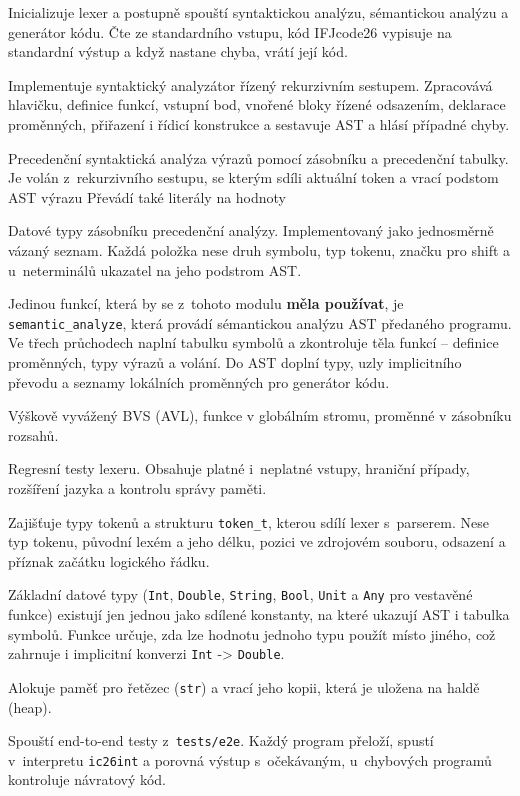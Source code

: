 \begin{description}[style=nextline]
  \item[\texttt{main.c}]
    Inicializuje lexer a postupně spouští syntaktickou analýzu, sémantickou
    analýzu a generátor kódu. Čte ze standardního vstupu, kód IFJcode26
    vypisuje na standardní výstup a když nastane chyba, vrátí její kód.
  \item[\texttt{parser.c/.h}]               Implementuje syntaktický analyzátor řízený rekurzivním sestupem. Zpracovává hlavičku, definice funkcí, vstupní bod, vnořené bloky řízené odsazením, deklarace proměnných, přiřazení i řídicí konstrukce a sestavuje AST a hlásí případné chyby.
  \item[\texttt{parser\_expression.c/.h}]
    Precedenční syntaktická analýza výrazů pomocí zásobníku a precedenční tabulky. Je volán z~rekurzivního
    sestupu, se kterým sdíli aktuální token a vrací podstom AST výrazu Převádí také literály na hodnoty
  \item[\texttt{parser\_stack.h}]
    Datové typy zásobníku precedenční analýzy. Implementovaný jako jednosměrně vázaný seznam.
    Každá položka nese druh symbolu, typ tokenu, značku pro shift a u~neterminálů ukazatel na jeho podstrom AST.
  \item[\texttt{semantic.c/.h}]
    Jedinou funkcí, která by se z~tohoto modulu \textbf{měla používat},
    je \texttt{semantic\_analyze}, která provádí sémantickou analýzu AST
    předaného programu. Ve třech průchodech naplní tabulku symbolů a zkontroluje
    těla funkcí -- definice proměnných, typy výrazů a volání. Do AST doplní typy, uzly implicitního převodu
    a seznamy lokálních proměnných pro generátor kódu.
  \item[\texttt{symtable.c/.h}]
    Výškově vyvážený BVS (AVL), funkce v globálním stromu, proměnné v zásobníku rozsahů.
  \item[\texttt{test\_lexer.c}]
    Regresní testy lexeru. Obsahuje platné i~neplatné vstupy, hraniční
    případy, rozšíření jazyka a kontrolu správy paměti.
  \item[\texttt{token.h}]
    Zajišťuje typy tokenů a strukturu \texttt{token\_t}, kterou sdílí lexer
    s~parserem. Nese typ tokenu, původní lexém a jeho délku, pozici ve
    zdrojovém souboru, odsazení a příznak začátku logického řádku.
  \item[\texttt{types.c/.h}]
  Základní datové typy  (\texttt{Int}, \texttt{Double}, \texttt{String}, \texttt{Bool},
  \texttt{Unit} a \texttt{Any} pro vestavěné funkce) existují jen jednou jako sdílené konstanty, na které ukazují
  AST i tabulka symbolů. Funkce  určuje, zda lze hodnotu jednoho typu použít místo jiného, což zahrnuje
  i implicitní konverzi \texttt{Int} -> \texttt{Double}.
  \item[\texttt{utils.c/.h}]
    Alokuje paměť pro řetězec (\texttt{str}) a vrací jeho kopii, která je
    uložena na haldě (heap).
  \item[\texttt{run.sh}]
    Spouští end-to-end testy z~\texttt{tests/e2e}. Každý program přeloží,
    spustí v~interpretu \texttt{ic26int} a porovná výstup s~očekávaným,
    u~chybových programů kontroluje návratový kód.
\end{description}
